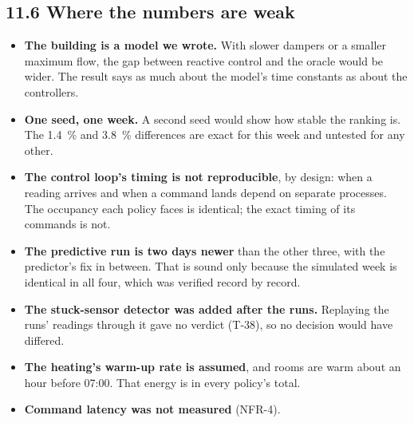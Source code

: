 
\subsection{11.6 Where the numbers are weak}

\begin{itemize}
\tightlist
\item \textbf{The building is a model we wrote.} With slower dampers or a
  smaller maximum flow, the gap between reactive control and the oracle would
  be wider. The result says as much about the model's time constants as about
  the controllers.
\item \textbf{One seed, one week.} A second seed would show how stable the
  ranking is. The 1.4~\% and 3.8~\% differences are exact for this week and
  untested for any other.
\item \textbf{The control loop's timing is not reproducible}, by design: when
  a reading arrives and when a command lands depend on separate processes. The
  occupancy each policy faces is identical; the exact timing of its commands
  is not.
\item \textbf{The predictive run is two days newer} than the other three, with
  the predictor's fix in between. That is sound only because the simulated
  week is identical in all four, which was verified record by record.
\item \textbf{The stuck-sensor detector was added after the runs.} Replaying
  the runs' readings through it gave no verdict (T-38), so no decision would
  have differed.
\item \textbf{The heating's warm-up rate is assumed}, and rooms are warm about
  an hour before 07:00. That energy is in every policy's total.
\item \textbf{Command latency was not measured} (NFR-4).
\end{itemize}
